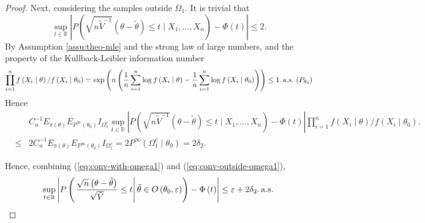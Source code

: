 \begin{proof}
Next, considering the samples outside $\Omega_{1}$. It is trivial
that 
\[
\sup_{t\in\mathbb{R}}\left|P\left(\sqrt{n\tilde{V}^{-1}}\left(\theta-\tilde{\theta}\right)\le t\mid X_{1},\ldots,X_{n}\right)-\Phi\left(t\right)\right|\le2.
\]
By Assumption \ref{assu:theo-mle} and the strong law of large numbers,
and the property of the Kullback-Leibler information number 
\[
\prod_{i=1}^{n}f\left(X_{i}\mid\theta\right)/f\left(X_{i}\mid\theta_{0}\right)=\exp\left(n\left(\frac{1}{n}\sum_{i=1}^{n}\log f\left(X_{i}\mid\theta\right)-\frac{1}{n}\sum_{i=1}^{n}\log f\left(X_{i}\mid\theta_{0}\right)\right)\right)\le1.\,\mathrm{a.s.}\,\left(P_{\theta_{0}}\right)
\]
Hence
\begin{eqnarray}
 &  & C_{n}^{-1}E_{\pi\left(\theta\right)}E_{P^{\infty}\left(\theta_{0}\right)}I_{\Omega_{1}^{c}}\sup_{t\in\mathbb{R}}\left|P\left(\sqrt{n\tilde{V}^{-1}}\left(\theta-\tilde{\theta}\right)\le t\mid X_{1},\ldots,X_{n}\right)-\Phi\left(t\right)\right|\prod_{i=1}^{n}f\left(X_{i}\mid\theta\right)/f\left(X_{i}\mid\theta_{0}\right).\nonumber \\
 & \le & 2C_{n}^{-1}E_{\pi\left(\theta\right)}E_{P^{\infty}\left(\theta_{0}\right)}I_{\Omega_{1}^{c}}=2P^{\infty}\left(\Omega_{1}^{c}\mid\theta_{0}\right)=2\delta_{2}.\label{eq:conv-outside-omega1}
\end{eqnarray}


Hence, combining (\ref{eq:conv-with-omega1}) and (\ref{eq:conv-outside-omega1}),
\[
\sup_{t\in\mathbb{R}}\left|P\left(\left.\frac{\sqrt{n}\left(\theta-\tilde{\theta}\right)}{\sqrt{\tilde{V}}}\le t\right|\tilde{\theta}\in O\left(\theta_{0},\varepsilon\right)\right)-\Phi\left(t\right)\right|\le\varepsilon+2\delta_{2}.\,\mathrm{a.s.}\,
\]

\end{proof}

